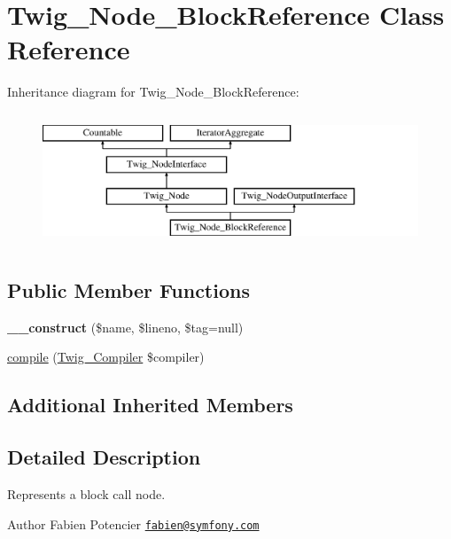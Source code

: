 \hypertarget{class_twig___node___block_reference}{}\section{Twig\+\_\+\+Node\+\_\+\+Block\+Reference Class Reference}
\label{class_twig___node___block_reference}
Inheritance diagram for Twig\+\_\+\+Node\+\_\+\+Block\+Reference\+:\begin{figure}[H]
\begin{center}
\leavevmode
\includegraphics[height=4.000000cm]{class_twig___node___block_reference}
\end{center}
\end{figure}
\subsection*{Public Member Functions}
\begin{DoxyCompactItemize}
\item 
\hypertarget{class_twig___node___block_reference_a0028166bd229cdc2e0c0a79c4f3069fa}{}{\bfseries \+\_\+\+\_\+construct} (\$name, \$lineno, \$tag=null)\label{class_twig___node___block_reference_a0028166bd229cdc2e0c0a79c4f3069fa}

\item 
\hyperlink{class_twig___node___block_reference_a4e0faa87c3fae583620b84d3607085da}{compile} (\hyperlink{class_twig___compiler}{Twig\+\_\+\+Compiler} \$compiler)
\end{DoxyCompactItemize}
\subsection*{Additional Inherited Members}


\subsection{Detailed Description}
Represents a block call node.

\begin{DoxyAuthor}{Author}
Fabien Potencier \href{mailto:fabien@symfony.com}{\tt fabien@symfony.\+com} 
\end{DoxyAuthor}


